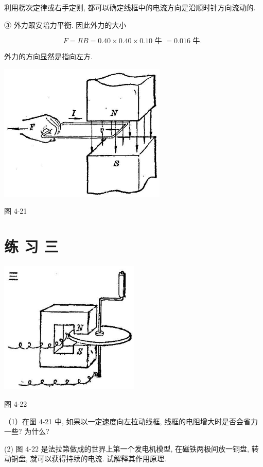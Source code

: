 \documentclass[10pt]{article}
\begin{document}
利用楞次定律或右手定则, 都可以确定线框中的电流方向是沿顺时针方向流动的.

③ 外力跟安培力平衡. 因此外力的大小

\[
F = {IlB} = {0.40} \times {0.40} \times {0.10}\text{ 牛 } = {0.016}\text{ 牛. }
\]

外力的方向显然是指向左方.

\begin{center}
\includegraphics[max width=0.6\textwidth]{images/01913056-1f15-74d8-9184-9aab52c9d66b_146_348977.jpg}
\end{center}

图 4-21

\section*{练 习 三}

\begin{center}
\includegraphics[max width=0.5\textwidth]{images/01913056-1f15-74d8-9184-9aab52c9d66b_146_934239.jpg}
\end{center}

图 4-22

（1）在图 4-21 中, 如果以一定速度向左拉动线框, 线框的电阻增大时是否会省力一些? 为什么?

(2) 图 4-22 是法拉第做成的世界上第一个发电机模型, 在磁铁两极间放一铜盘, 转动铜盘, 就可以获得持续的电流. 试解释其作用原理.
\end{document}
